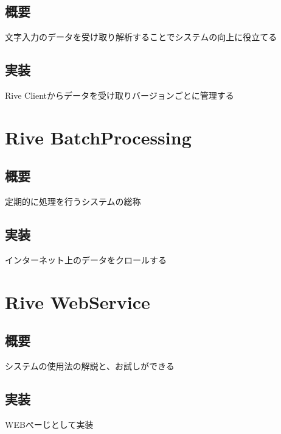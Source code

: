 \subsection{概要}
文字入力のデータを受け取り解析することでシステムの向上に役立てる
\subsection{実装}
Rive Clientからデータを受け取りバージョンごとに管理する

\section{Rive BatchProcessing}
\subsection{概要}
定期的に処理を行うシステムの総称
\subsection{実装}
インターネット上のデータをクロールする

\section{Rive WebService}
\subsection{概要}
システムの使用法の解説と、お試しができる
\subsection{実装}
WEBぺーじとして実装
